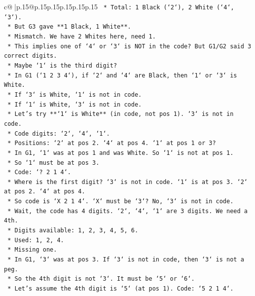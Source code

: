 \documentclass{article}
\begin{document}
{\begin{supertabular}{c@{$\;$}|p{.15\linewidth}@{}p{.15\linewidth}p{.15\linewidth}p{.15\linewidth}p{.15\linewidth}p{.15\linewidth}}
{{{\texttt{            *   Total: 1 Black (`2`), 2 White (`4`, `3`).} \\
\texttt{            *   But G3 gave **1 Black, 1 White**.} \\
\texttt{            *   Mismatch. We have 2 Whites here, need 1.} \\
\texttt{            *   This implies one of `4` or `3` is NOT in the code? But G1/G2 said 3 correct digits.} \\
\texttt{            *   Maybe `1` is the third digit?} \\
\texttt{            *   In G1 (`1 2 3 4`), if `2` and `4` are Black, then `1` or `3` is White.} \\
\texttt{            *   If `3` is White, `1` is not in code.} \\
\texttt{            *   If `1` is White, `3` is not in code.} \\
\texttt{            *   Let's try **`1` is White** (in code, not pos 1). `3` is not in code.} \\
\texttt{            *   Code digits: `2`, `4`, `1`.} \\
\texttt{            *   Positions: `2` at pos 2. `4` at pos 4. `1` at pos 1 or 3?} \\
\texttt{            *   In G1, `1` was at pos 1 and was White. So `1` is not at pos 1.} \\
\texttt{            *   So `1` must be at pos 3.} \\
\texttt{            *   Code: `? 2 1 4`.} \\
\texttt{            *   Where is the first digit? `3` is not in code. `1` is at pos 3. `2` at pos 2. `4` at pos 4.} \\
\texttt{            *   So code is `X 2 1 4`. `X` must be `3`? No, `3` is not in code.} \\
\texttt{            *   Wait, the code has 4 digits. `2`, `4`, `1` are 3 digits. We need a 4th.} \\
\texttt{            *   Digits available: 1, 2, 3, 4, 5, 6.} \\
\texttt{            *   Used: 1, 2, 4.} \\
\texttt{            *   Missing one.} \\
\texttt{            *   In G1, `3` was at pos 3. If `3` is not in code, then `3` is not a peg.} \\
\texttt{            *   So the 4th digit is not `3`. It must be `5` or `6`.} \\
\texttt{            *   Let's assume the 4th digit is `5` (at pos 1). Code: `5 2 1 4`.} \\
}}}
\end{supertabular}}
\end{document}
